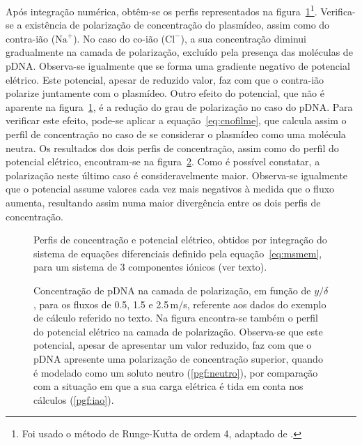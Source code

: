 Após integração numérica, obtêm-se os perfis representados na figura~\ref{fig:resexemploioes}\footnote{Foi usado o método de Runge-Kutta de ordem 4, adaptado de \cite{arnold}.}. 
Verifica-se a existência de polarização de concentração do plasmídeo, assim como do contra-ião ($\mathrm{Na}^{+}$). 
No caso do co-ião ($\mathrm{Cl}^{-}$), a sua concentração diminui gradualmente na camada de polarização, excluído pela presença das moléculas de pDNA. Observa-se igualmente que se forma uma gradiente negativo de potencial elétrico. 
Este potencial, apesar de reduzido valor, faz com que o contra-ião polarize juntamente com o plasmídeo. Outro efeito do potencial, que não é aparente na figura~\ref{fig:resexemploioes}, é a redução do grau de polarização no caso do pDNA. Para verificar este efeito, pode-se aplicar a equação~\ref{eq:cnofilme}, que calcula assim o perfil de concentração no caso de se considerar o plasmídeo como uma molécula neutra. Os resultados dos dois perfis de concentração, assim como do perfil do potencial elétrico, encontram-se na figura~\ref{fig:pc_n_vs_i}. 
Como é possível constatar, a polarização neste último caso é consideravelmente maior. Observa-se igualmente que o potencial assume valores cada vez mais negativos à medida que o fluxo aumenta, resultando assim numa maior divergência entre os dois perfis de concentração.
\begin{figure}[!t]
	\centering
	
	\caption[Sistema de 3 componentes iónicos]{Perfis de concentração e potencial elétrico, obtidos por integração do sistema de equações diferenciais definido pela equação~\ref{eq:msmem}, para um sistema de 3 componentes iónicos (ver texto).}
	\label{fig:resexemploioes}
\end{figure}
\begin{figure}
	\centering
	
	\caption[Polarização de concentração de pDNA considerando-o neutro e com carga.]{Concentração de pDNA na camada de polarização, em função de $y/\delta$, para os fluxos de 0.5, 1.5 e 2.5\,\micro m/s, referente aos dados do exemplo de cálculo referido no texto. Na figura encontra-se também o perfil do potencial elétrico na camada de polarização. Observa-se que este potencial, apesar de apresentar um valor reduzido, faz com que o pDNA apresente uma polarização de concentração superior, quando é modelado como um soluto neutro (\ref{pgf:neutro}), por comparação com a situação em que a sua carga elétrica é tida em conta nos cálculos (\ref{pgf:iao}).}
	\label{fig:pc_n_vs_i}
\end{figure}



